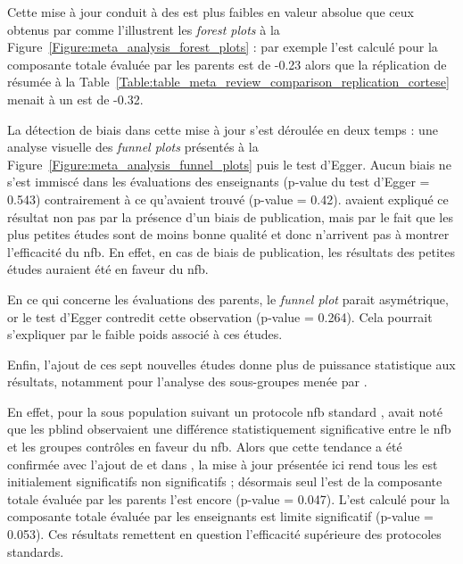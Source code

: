 \begin{itemize}
Cette mise à jour conduit à des \gls{est} plus faibles en valeur absolue que ceux obtenus par \citet{Cortese2016} comme l'illustrent les \textit{forest plots} à 
la Figure~\ref{Figure:meta_analysis_forest_plots} : par exemple l'\gls{est} calculé pour la composante totale évaluée par les parents est de -0.23 alors
que la réplication de \citet{Cortese2016} résumée à la Table~\ref{Table:table_meta_review_comparison_replication_cortese} menait à un \gls{est} de -0.32.

La détection de biais dans cette mise à jour s'est déroulée en deux temps : une analyse visuelle des \textit{funnel plots} présentés à la Figure~\ref{Figure:meta_analysis_funnel_plots}
puis le test d'Egger. Aucun biais ne s'est immiscé dans les évaluations des enseignants (p-value du test d'Egger = 0.543) contrairement à ce qu'avaient trouvé \citet{Cortese2016} (p-value = 0.42). 
\citet{Cortese2016} avaient expliqué ce résultat non pas par la présence d'un biais de publication, mais par le fait que les plus petites études sont 
de moins bonne qualité et donc n'arrivent pas à montrer l'efficacité du \gls{nfb}. En effet, en cas de biais de publication, les résultats des petites
études auraient été en faveur du \gls{nfb}. 

En ce qui concerne les évaluations des parents, le \textit{funnel plot} parait asymétrique, or le test d'Egger contredit cette observation (p-value = 0.264). 
Cela pourrait s'expliquer par le faible poids associé à ces études. 

Enfin, l'ajout de ces sept nouvelles études donne plus de puissance statistique aux résultats, notamment pour l'analyse des sous-groupes menée par \citet{Cortese2016}.

En effet, pour la sous population suivant un protocole \gls{nfb} standard \citep{Arns2014}, \citet{Cortese2016} avait noté que les \gls{pblind} observaient
une différence statistiquement significative entre le \gls{nfb} et les groupes contrôles en faveur du \gls{nfb}. Alors que cette tendance a été confirmée avec l'ajout 
de \citet{Baumeister2016} et \citet{Strehl2017} dans \citet{Bussalb2019clinical}, la mise à jour présentée ici rend tous les \gls{est} initialement significatifs 
non significatifs ; désormais seul l'\gls{est} de la composante totale évaluée par les parents l'est encore (p-value = 0.047). 
L'\gls{est} calculé pour la composante totale évaluée par les enseignants est limite significatif (p-value = 0.053). Ces résultats remettent en question l'efficacité
supérieure des protocoles standards.


\end{itemize}
